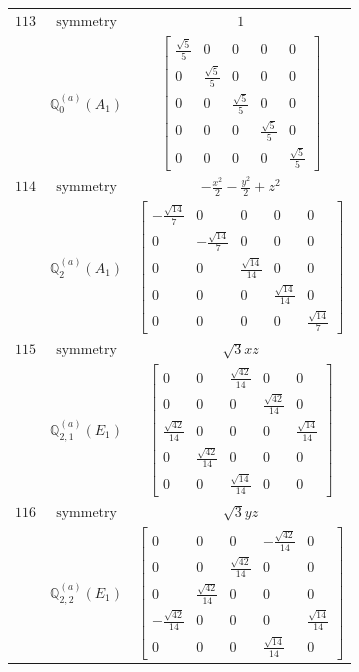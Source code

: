 \documentclass[fleqn,8pt,landscape]{jsarticle}
\begin{document}
\begin{longtable}{ccc}
$ 113 $ & $ \text{symmetry} $ & $ 1 $ \\
$  $ & $ \mathbb{Q}_{0}^{(a)}(A_{1}) $ & $ \begin{bmatrix} \frac{\sqrt{5}}{5} & 0 & 0 & 0 & 0 \\ 0 & \frac{\sqrt{5}}{5} & 0 & 0 & 0 \\ 0 & 0 & \frac{\sqrt{5}}{5} & 0 & 0 \\ 0 & 0 & 0 & \frac{\sqrt{5}}{5} & 0 \\ 0 & 0 & 0 & 0 & \frac{\sqrt{5}}{5} \end{bmatrix} $ \\ \hline
$ 114 $ & $ \text{symmetry} $ & $ - \frac{x^{2}}{2} - \frac{y^{2}}{2} + z^{2} $ \\
$  $ & $ \mathbb{Q}_{2}^{(a)}(A_{1}) $ & $ \begin{bmatrix} - \frac{\sqrt{14}}{7} & 0 & 0 & 0 & 0 \\ 0 & - \frac{\sqrt{14}}{7} & 0 & 0 & 0 \\ 0 & 0 & \frac{\sqrt{14}}{14} & 0 & 0 \\ 0 & 0 & 0 & \frac{\sqrt{14}}{14} & 0 \\ 0 & 0 & 0 & 0 & \frac{\sqrt{14}}{7} \end{bmatrix} $ \\ \hline
$ 115 $ & $ \text{symmetry} $ & $ \sqrt{3} x z $ \\
$  $ & $ \mathbb{Q}_{2,1}^{(a)}(E_{1}) $ & $ \begin{bmatrix} 0 & 0 & \frac{\sqrt{42}}{14} & 0 & 0 \\ 0 & 0 & 0 & \frac{\sqrt{42}}{14} & 0 \\ \frac{\sqrt{42}}{14} & 0 & 0 & 0 & \frac{\sqrt{14}}{14} \\ 0 & \frac{\sqrt{42}}{14} & 0 & 0 & 0 \\ 0 & 0 & \frac{\sqrt{14}}{14} & 0 & 0 \end{bmatrix} $ \\ \hline
$ 116 $ & $ \text{symmetry} $ & $ \sqrt{3} y z $ \\
$  $ & $ \mathbb{Q}_{2,2}^{(a)}(E_{1}) $ & $ \begin{bmatrix} 0 & 0 & 0 & - \frac{\sqrt{42}}{14} & 0 \\ 0 & 0 & \frac{\sqrt{42}}{14} & 0 & 0 \\ 0 & \frac{\sqrt{42}}{14} & 0 & 0 & 0 \\ - \frac{\sqrt{42}}{14} & 0 & 0 & 0 & \frac{\sqrt{14}}{14} \\ 0 & 0 & 0 & \frac{\sqrt{14}}{14} & 0 \end{bmatrix} $ \\ \hline

\end{longtable}
\end{document}
